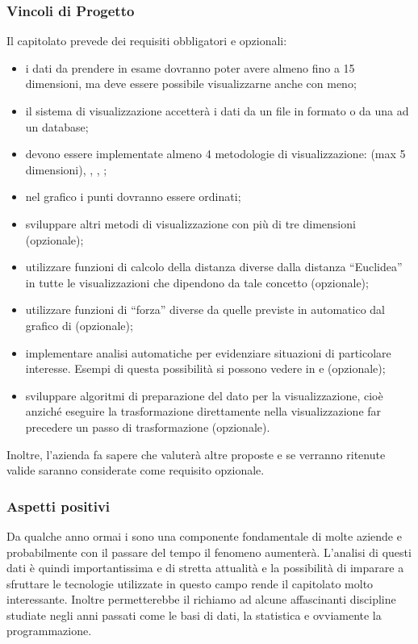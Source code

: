 \documentclass[]{article}
\begin{document}
		\subsubsection{Vincoli di Progetto}
		Il capitolato prevede dei requisiti obbligatori e opzionali:
		\begin{itemize}
			\item i dati da prendere in esame dovranno poter avere almeno fino a 15 dimensioni, ma deve essere possibile visualizzarne anche con meno;
			\item il sistema di visualizzazione accetterà i dati da un file in formato  o da una  ad un database;
			\item devono essere implementate almeno 4 metodologie di visualizzazione:  (max 5 dimensioni), , , ;
			\item nel grafico  i punti dovranno essere ordinati;
			\item sviluppare altri metodi di visualizzazione con più di tre dimensioni (opzionale);
			\item utilizzare funzioni di calcolo della distanza diverse dalla distanza “Euclidea” in tutte le visualizzazioni che dipendono da tale concetto (opzionale);
			\item utilizzare funzioni di “forza” diverse da quelle previste in automatico dal grafico  di  (opzionale);
			\item implementare analisi automatiche per evidenziare situazioni di particolare interesse. Esempi di questa possibilità si possono vedere in  e  (opzionale);
			\item sviluppare algoritmi di preparazione del dato per la visualizzazione, cioè anziché eseguire la trasformazione direttamente nella visualizzazione far precedere un passo di trasformazione (opzionale).
		\end{itemize}
		Inoltre, l'azienda fa sapere che valuterà altre proposte e se verranno ritenute valide saranno considerate come requisito opzionale.

		\subsubsection{Aspetti positivi}
		Da qualche anno ormai i  sono una componente fondamentale di molte aziende e probabilmente con il passare del tempo il fenomeno aumenterà. L'analisi di questi dati è quindi importantissima e di stretta attualità e la possibilità di imparare a sfruttare le tecnologie utilizzate in questo campo rende il capitolato molto interessante. Inoltre permetterebbe il richiamo ad alcune affascinanti discipline studiate negli anni passati come le basi di dati, la statistica e ovviamente la programmazione.
\end{document}
